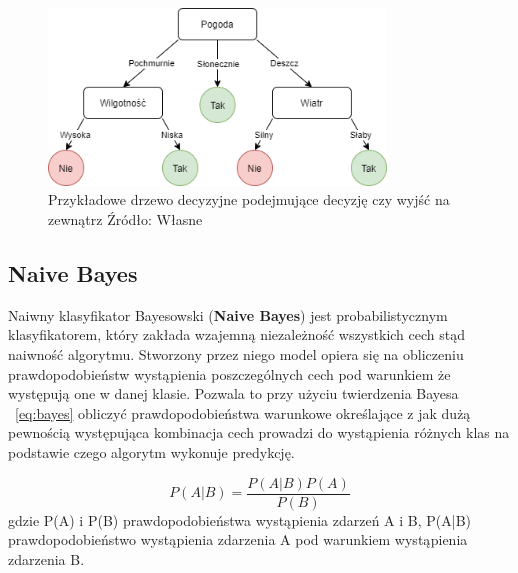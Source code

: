\begin{figure}[h]
    \centering
    \includegraphics[width=0.8\textwidth]{./Img/BinaryTree.png}
    \caption{Przykładowe drzewo decyzyjne podejmujące decyzję czy wyjść na zewnątrz Źródło: Własne}
\end{figure}


\subsection{Naive Bayes}

Naiwny klasyfikator Bayesowski (\textbf{Naive Bayes}) jest probabilistycznym klasyfikatorem, który
zakłada wzajemną niezależność wszystkich cech stąd naiwność algorytmu. Stworzony przez niego model
opiera się na obliczeniu prawdopodobieństw wystąpienia poszczególnych cech pod warunkiem że 
występują one w danej klasie. Pozwala to przy użyciu twierdzenia Bayesa ~\ref{eq:bayes} obliczyć prawdopodobieństwa 
warunkowe określające z jak dużą pewnością występująca kombinacja cech prowadzi do 
wystąpienia różnych klas na podstawie czego algorytm wykonuje predykcję. 


\begin{equation}
    \label{eq:bayes}
    P(A|B) = \frac{P(A|B)P(A)}{P(B)}
\end{equation}
gdzie P(A) i P(B) prawdopodobieństwa wystąpienia zdarzeń A i B, P(A|B) prawdopodobieństwo wystąpienia
zdarzenia A pod warunkiem wystąpienia zdarzenia B.

